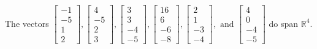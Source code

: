 \begin{exercise}
\begin{exerciseStatement}
  \end{exerciseStatement}
  \begin{exerciseAnswer}
   The vectors \(\left[\begin{array}{r}
-1 \\
-5 \\
1 \\
2
\end{array}\right] , \left[\begin{array}{r}
4 \\
-5 \\
2 \\
3
\end{array}\right] , \left[\begin{array}{r}
3 \\
3 \\
-4 \\
-5
\end{array}\right] , \left[\begin{array}{r}
16 \\
6 \\
-6 \\
-8
\end{array}\right] , \left[\begin{array}{r}
2 \\
1 \\
-3 \\
-4
\end{array}\right] , \text{ and } \left[\begin{array}{r}
4 \\
0 \\
-4 \\
-5
\end{array}\right]\) 
  	 do  
	span \(\mathbb{R}^4\).
  


  \end{exerciseAnswer}
\end{exercise}